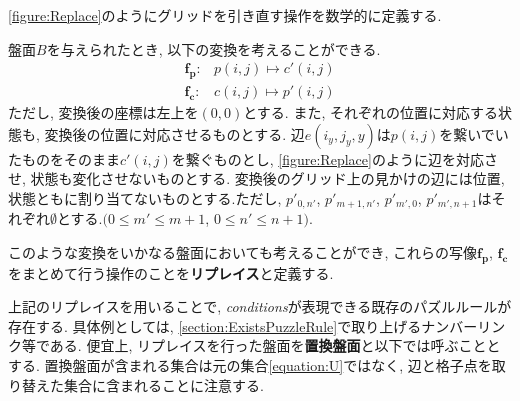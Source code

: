 \cref{figure:Replace}のようにグリッドを引き直す操作を数学的に定義する.
\begin{definition}[リプレイス]\label{definition:Replace}
  盤面$B$を与えられたとき, 以下の変換を考えることができる.
  \begin{align}
    \bm{f_p}\colon & p(i,j)  \longmapsto c'(i,j) \\
    \bm{f_c}\colon & c(i,j)  \longmapsto p'(i,j)
  \end{align}
  ただし, 変換後の座標は左上を$(0,0)$とする.
  また, それぞれの位置に対応する状態も, 変換後の位置に対応させるものとする. 辺$e(i_y,j_y,y)$は$p(i,j)$を繋いでいたものをそのまま$c'(i,j)$を繋ぐものとし, \cref{figure:Replace}のように辺を対応させ, 状態も変化させないものとする. 変換後のグリッド上の見かけの辺には位置, 状態ともに割り当てないものとする.ただし, $p'_{0,n'}$, $p'_{m+1,n'}$, $p'_{m',0}$, $p'_{m',n+1}$はそれぞれ$\emptyset$とする.$(0\le m' \le m+1$, $0\le n'\le n+1)$.

  このような変換をいかなる盤面においても考えることができ, これらの写像$\bm{f_p}$, $\bm{f_c}$をまとめて行う操作のことを\textbf{リプレイス}と定義する.
\end{definition}
上記のリプレイスを用いることで, \textit{conditions}が表現できる既存のパズルルールが存在する. 具体例としては, \cref{section:ExistsPuzzleRule}で取り上げるナンバーリンク等である. 便宜上, リプレイスを行った盤面を\textbf{置換盤面}と以下では呼ぶこととする. 置換盤面が含まれる集合は元の集合\cref{equation:U}ではなく, 辺と格子点を取り替えた集合に含まれることに注意する.



